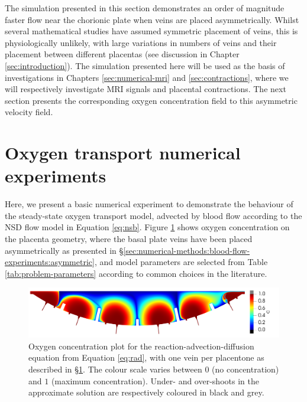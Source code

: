             The simulation presented in this section demonstrates an order of magnitude faster flow near the chorionic plate when veins are placed asymmetrically. Whilst several mathematical studies have assumed symmetric placement of veins, this is physiologically unlikely, with large variations in numbers of veins and their placement between different placentas (see discussion in Chapter \ref{sec:introduction}). The simulation presented here will be used as the basis of investigations in Chapters \ref{sec:numerical-mri} and \ref{sec:contractions}, where we will respectively investigate MRI signals and placental contractions. The next section presents the corresponding oxygen concentration field to this asymmetric velocity field.

    \section{Oxygen transport numerical experiments} \label{sec:numerical-methods:nutrient-transport-experiments}
        Here, we present a basic numerical experiment to demonstrate the behaviour of the steady-state oxygen transport model, advected by blood flow according to the NSD flow model in Equation \eqref{eq:nsb}. Figure \ref{fig:transport-placenta} shows oxygen concentration on the placenta geometry, where the basal plate veins have been placed asymmetrically as presented in \S\ref{sec:numerical-methods:blood-flow-experiments:asymmetric}, and model parameters are selected from Table \ref{tab:problem-parameters} according to common choices in the literature.

        \begin{figure}
            \centering
            \includegraphics[width=\textwidth]{diagrams/results-modelling/velocity-transport/oxygen_asymmetric.png}
            \caption{Oxygen concentration plot for the reaction-advection-diffusion equation from Equation \eqref{eq:rad}, with one vein per placentone as described in \S\ref{sec:numerical-methods:nutrient-transport-experiments}. The colour scale varies between $0$ (no concentration) and $1$ (maximum concentration). Under- and over-shoots in the approximate solution are respectively coloured in black and grey.}
            \label{fig:transport-placenta}
        \end{figure}

